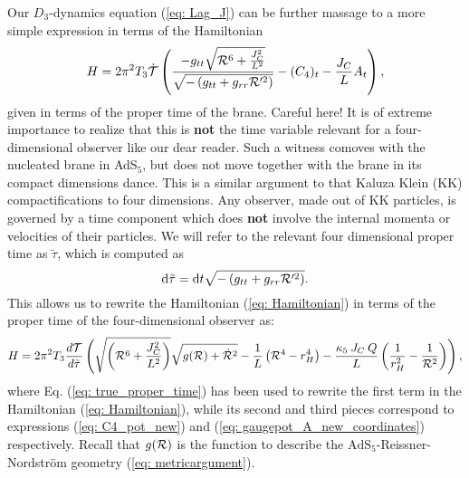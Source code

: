 Our $D_{3}$-dynamics equation (\ref{eq: Lag_J}) can be further massage to a more simple expression in terms of the Hamiltonian
\begin{equation}\label{eq: Hamiltonian}
    H=2\pi^2 T_3 \dot{\mathcal{T}} \left( \frac{-g_{tt} \sqrt{\mathcal{R}^6 + \frac{J_C^2}{L^2}}}{\sqrt{ -\left(g_{tt}+g_{rr} \mathcal{R}'^2 \right)}} -(C_4)_t  - \frac{J_C}{L}A_t \right),
\end{equation}
given in terms of the proper time of the brane. Careful here! It is of extreme importance to realize that this is \textbf{not} the time variable relevant for a four-dimensional observer like our dear reader. Such a witness comoves with the nucleated brane in AdS$_5$, but does not move together with the brane in its compact dimensions dance. This is a similar argument to that Kaluza Klein (KK) compactifications to four dimensions. Any observer, made out of KK particles, is governed by a time component which does \textbf{not} involve the internal momenta or velocities of their particles. We will refer to the relevant four dimensional proper time as $\tilde{\tau}$, which is computed as
\begin{equation}\label{eq: true_proper_time}
    \text{d} \tilde{\tau} = \text{d} t \sqrt{ -\left(g_{tt}+g_{rr} \mathcal{R}'^2 \right) }.
\end{equation}
This allows us to rewrite the Hamiltonian (\ref{eq: Hamiltonian}) in terms of the proper time of the four-dimensional observer as:
\begin{equation} \label{eq: rewritten_hamiltonian}
    H= 2\pi^2 T_3 \frac{d\mathcal{T}}{d \tilde{\tau}} \left( \sqrt{\left(\mathcal{R}^6 + \frac{J_C^2}{L^2}\right) }\sqrt{ g(\mathcal{R} )+\dot{\mathcal{R}}^2  }-\frac{1}{L} \left(\mathcal{R}^4-r_H^4\right) - \frac{\kappa_{5}\:J_C \:Q}{L}\left(\frac{1}{r_H^2}-\frac{1}{\mathcal{R}^2} \right)\right),
\end{equation}
where Eq. (\ref{eq: true_proper_time}) has been used to rewrite the first term in the Hamiltonian (\ref{eq: Hamiltonian}), while its second and third pieces correspond to expressions (\ref{eq: C4_pot_new}) and (\ref{eq: gaugepot_A_new_coordinates}) respectively. Recall that $g(\mathcal{R})$ is the function to describe the $\text{AdS}_{5}$-Reissner-Nordström geometry (\ref{eq: metricargument}).

